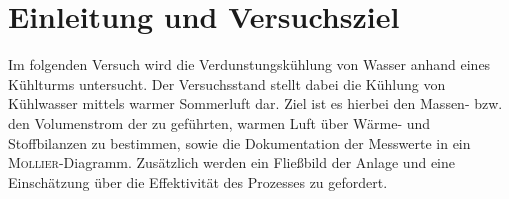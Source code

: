 \section{Einleitung und Versuchsziel}
\label{sec:aufgabenstellung}

Im folgenden Versuch wird die Verdunstungskühlung von Wasser anhand eines Kühlturms untersucht. Der Versuchsstand stellt dabei die Kühlung von Kühlwasser mittels warmer Sommerluft dar. Ziel ist es hierbei den Massen- bzw. den Volumenstrom der zu geführten, warmen Luft über Wärme- und Stoffbilanzen zu bestimmen, sowie die Dokumentation der Messwerte in ein \textsc{Mollier}-Diagramm. Zusätzlich werden ein Fließbild der Anlage und eine Einschätzung über die Effektivität des Prozesses zu gefordert. \\



